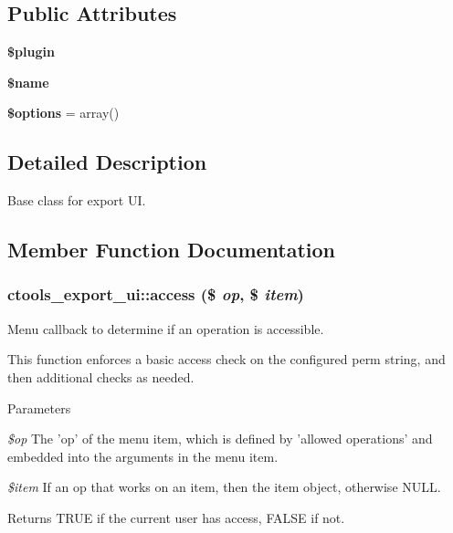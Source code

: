 \subsection*{Public Attributes}
\begin{DoxyCompactItemize}
\item 
\hypertarget{classctools__export__ui_ae6d10c939530db29b092abf9f8e2ba95}{
{\bfseries \$plugin}}
\label{classctools__export__ui_ae6d10c939530db29b092abf9f8e2ba95}

\item 
\hypertarget{classctools__export__ui_a2721079ee8f174f841ebf282978c59b1}{
{\bfseries \$name}}
\label{classctools__export__ui_a2721079ee8f174f841ebf282978c59b1}

\item 
\hypertarget{classctools__export__ui_a490a44965b4046e73acf320f0c072d50}{
{\bfseries \$options} = array()}
\label{classctools__export__ui_a490a44965b4046e73acf320f0c072d50}

\end{DoxyCompactItemize}


\subsection{Detailed Description}
Base class for export UI. 

\subsection{Member Function Documentation}
\hypertarget{classctools__export__ui_a2969ae536055dec201470f76f107450b}{
\subsubsection[{access}]{\setlength{\rightskip}{0pt plus 5cm}ctools\_\-export\_\-ui::access (\$ {\em op}, \/  \$ {\em item})}}
\label{classctools__export__ui_a2969ae536055dec201470f76f107450b}
Menu callback to determine if an operation is accessible.

This function enforces a basic access check on the configured perm string, and then additional checks as needed.


\begin{DoxyParams}{Parameters}
\item[{\em \$op}]The 'op' of the menu item, which is defined by 'allowed operations' and embedded into the arguments in the menu item. \item[{\em \$item}]If an op that works on an item, then the item object, otherwise NULL.\end{DoxyParams}
\begin{DoxyReturn}{Returns}
TRUE if the current user has access, FALSE if not. 
\end{DoxyReturn}


